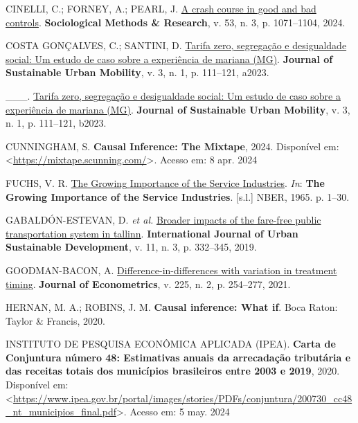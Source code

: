 \documentclass[12pt, a4paper, twoside]{article}
\numberwithin{equation}{subsection} %
\newlength{\cslhangindent}
\newlength{\cslentryspacingunit} %
\newenvironment{CSLReferences}[2] %
 {%
  \setlength{\parindent}{0pt}
  \ifodd #1
  \let\oldpar\par
  \def\par{\hangindent=\cslhangindent\oldpar}
  \fi
  \setlength{\parskip}{#2\cslentryspacingunit}
 }%
 {}
\begin{document}
\begin{CSLReferences}{0}{0}
\leavevmode{}%
CINELLI, C.; FORNEY, A.; PEARL, J.
\href{https://doi.org/10.1177/00491241221099552}{A crash course in good
and bad controls}. \textbf{Sociological Methods \& Research}, v. 53, n.
3, p. 1071--1104, 2024.

\leavevmode{}%
COSTA GONÇALVES, C.; SANTINI, D.
\href{https://doi.org/10.53613/josum.2023.v3.009}{Tarifa zero,
segregação e desigualdade social: Um estudo de caso sobre a experiência
de mariana (MG)}. \textbf{Journal of Sustainable Urban Mobility}, v. 3,
n. 1, p. 111--121, a2023.

\leavevmode{}%
\_\_\_. \href{https://doi.org/10.53613/josum.2023.v3.009}{Tarifa zero,
segregação e desigualdade social: Um estudo de caso sobre a experiência
de mariana (MG)}. \textbf{Journal of Sustainable Urban Mobility}, v. 3,
n. 1, p. 111--121, b2023.

\leavevmode{}%
CUNNINGHAM, S. \textbf{Causal {Inference}: {The} {Mixtape}}, 2024.
Disponível em:
\textless{}\url{https://mixtape.scunning.com/}\textgreater. Acesso em: 8
apr. 2024

\leavevmode{}%
FUCHS, V. R.
\href{https://www.nber.org/books-and-chapters/growing-importance-service-industries/growing-importance-service-industries}{The
{Growing} {Importance} of the {Service} {Industries}}. \emph{In}:
\textbf{The {Growing} {Importance} of the {Service} {Industries}}.
{[}s.l.{]} NBER, 1965. p. 1--30.

\leavevmode{}%
GABALDÓN-ESTEVAN, D. \emph{et al.}
\href{https://doi.org/10.1080/19463138.2019.1596114}{Broader impacts of
the fare-free public transportation system in tallinn}.
\textbf{International Journal of Urban Sustainable Development}, v. 11,
n. 3, p. 332--345, 2019.

\leavevmode{}%
GOODMAN-BACON, A.
\href{https://doi.org/10.1016/j.jeconom.2021.03.014}{Difference-in-differences
with variation in treatment timing}. \textbf{Journal of Econometrics},
v. 225, n. 2, p. 254--277, 2021.

\leavevmode{}%
HERNAN, M. A.; ROBINS, J. M. \textbf{Causal inference: What if}. Boca
Raton: Taylor \& Francis, 2020.

\leavevmode{}%
INSTITUTO DE PESQUISA ECONÔMICA APLICADA (IPEA). \textbf{Carta de
{Conjuntura} número 48: {Estimativas} anuais da arrecadação tributária e
das receitas totais dos municípios brasileiros entre 2003 e 2019}, 2020.
Disponível em:
\textless{}\url{https://www.ipea.gov.br/portal/images/stories/PDFs/conjuntura/200730_cc48_nt_municipios_final.pdf}\textgreater.
Acesso em: 5 may. 2024


\end{CSLReferences}
\end{document}
